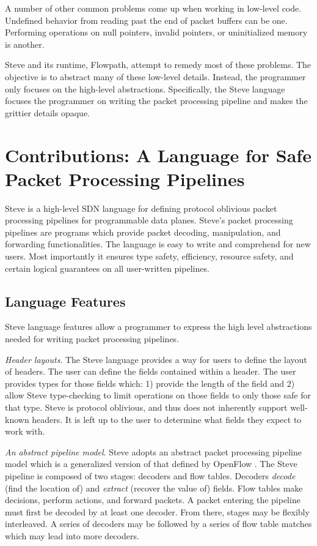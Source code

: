 A number of other common problems come up when working in low-level code.
Undefined behavior from reading past the end of packet buffers can be one.
Performing operations on null pointers, invalid pointers, or uninitialized
memory is another.

Steve and its runtime, Flowpath, attempt to remedy most of these problems. The
objective is to abstract many of these low-level details. Instead, the
programmer only focuses on the high-level abstractions. Specifically, the Steve
language focuses the programmer on writing the packet processing pipeline and
makes the grittier details opaque.

\section{Contributions: A Language for Safe Packet Processing Pipelines}

Steve is a high-level SDN language for defining protocol oblivious packet
processing pipelines for programmable data planes. Steve's packet processing
pipelines are programs which provide packet decoding, manipulation, and
forwarding functionalities. The language is easy to write and comprehend for new
users. Most importantly it ensures type safety, efficiency, resource safety, and
certain logical guarantees on all user-written pipelines.

\subsection{Language Features}

Steve language features allow a programmer to express the high level
abstractions needed for writing packet processing pipelines.

\emph{Header layouts}. The Steve language provides a way for users to define the
layout of headers. The user can define the fields contained within a header. The
user provides types for those fields which: 1) provide the length of the field
and 2) allow Steve type-checking to limit operations on those fields to only
those safe for that type. Steve is protocol oblivious, and thus does not
inherently support well-known headers. It is left up to the user to determine
what fields they expect to work with.

\emph{An abstract pipeline model}. Steve adopts an abstract packet processing
pipeline model which is a generalized version of that defined by OpenFlow
\cite{openflow_spec}. The Steve pipeline is composed of two stages: decoders and
flow tables. Decoders \textit{decode} (find the location of) and
\textit{extract} (recover the value of) fields. Flow tables make decisions,
perform actions, and forward packets. A packet entering the pipeline must first
be decoded by at least one decoder. From there, stages may be flexibly
interleaved. A series of decoders may be followed by a series of flow table
matches which may lead into more decoders.


